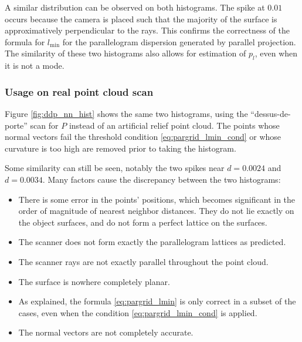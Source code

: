 A similar distribution can be observed on both histograms. The spike at $0.01$ occurs because the camera is placed such that the majority of the surface is approximatively perpendicular to the rays. This confirms the correctness of the formula for $l_{\text{min}}$ for the parallelogram dispersion generated by parallel projection. The similarity of these two histograms also allows for estimation of $p_l$, even when it is not a mode.
 

\subsubsection{Usage on real point cloud scan}
Figure \ref{fig:ddp_nn_hist} shows the same two histograms, using the ``dessus-de-porte'' scan for $P$ instead of an artificial relief point cloud. The points whose normal vectors fail the threshold condition \ref{eq:pargrid_lmin_cond} or whose curvature is too high are removed prior to taking the histogram.

Some similarity can still be seen, notably the two spikes near $d = 0.0024$ and $d = 0.0034$. Many factors cause the discrepancy between the two histograms:
\begin{itemize}
\item There is some error in the points' positions, which becomes significant in the order of magnitude of nearest neighbor distances. They do not lie exactly on the object surfaces, and do not form a perfect lattice on the surfaces.
\item The scanner does not form exactly the parallelogram lattices as predicted.
\item The scanner rays are not exactly parallel throughout the point cloud.
\item The surface is nowhere completely planar.
\item As explained, the formula \ref{eq:pargrid_lmin} is only correct in a subset of the cases, even when the condition \ref{eq:pargrid_lmin_cond} is applied.
\item The normal vectors are not completely accurate.
\end{itemize}

